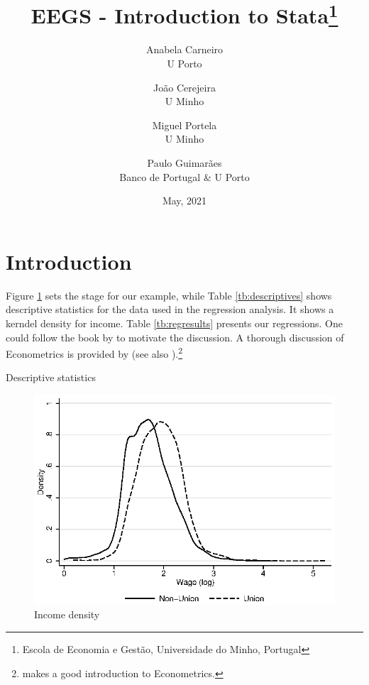 \documentclass[a4paper,12pt]{article}
\title{EEGS - Introduction to Stata\thanks{Escola de Economia e Gestão, Universidade do Minho, Portugal}}
\date{May, 2021}
\author{Anabela Carneiro\\ U Porto
\and João Cerejeira \\ U Minho
\and Miguel Portela \\ U Minho 
\and Paulo Guimarães \\ Banco de Portugal \& U Porto}
\begin{document}
\maketitle

\section{Introduction}\label{sec:intro}

Figure \ref{fig:incdensity} sets the stage for our example, while Table \ref{tb:descriptives} shows descriptive statistics for the data used in the regression analysis. It shows a kerndel density for income. Table \ref{tb:regresults} presents our regressions. One could follow the book by \cite{acemoglu2016} to motivate the discussion. A thorough discussion of Econometrics is provided by \cite{greene2017} (see also \citep{verbeek2012}).\footnote{\cite{wooldridge2015introductory} makes a good introduction to Econometrics.}

\lipsum

\begin{table}[ht]
\begin{center}
\caption{Descriptive statistics}\label{tb:descriptives}
\resizebox{0.9\textwidth}{!}
	{}
\end{center}
\end{table}

\lipsum

\lipsum

\begin{figure}[ht]
	\begin{center}
		\includegraphics[scale = 0.9,trim = 0.0 0.0 0.0 0.0,clip]{figures/fig_wage_density_union.eps}
		\caption{Income density}\label{fig:incdensity}
	\end{center}
\end{figure}

\lipsum



\lipsum


\end{document}
